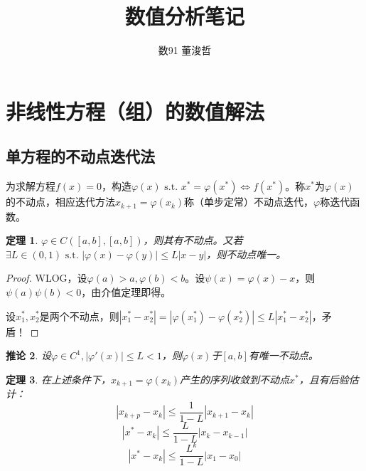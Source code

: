 \documentclass{ctexart}
\title{数值分析笔记}
\author{数91 董浚哲}
\begin{document}
\maketitle
\newcommand{\R}{\mathbf{R}}
\newcommand{\dd}{\,\mathrm{d}}
\newcommand{\st}{\text{ s.t. }}
\newcommand{\pp}[2]{\frac{\partial #1}{\partial #2}}
\newcommand{\fl}{\mathrm{fl}}
\newcommand{\nm}[1]{\left\|#1 \right\|}
\newcommand{\dif}[2]{\frac{\mathrm{d}#1}{\mathrm{d}#2}}

\newtheorem{Thm}{定理}[section]
\newtheorem{Lemma}[Thm]{引理}
\newtheorem{Prop}[Thm]{命题}
\newtheorem{Cor}[Thm]{推论}
\newtheorem{Def}{定义}[section]
\newtheorem{Rmk}{注}[section]
\newtheorem{Eg}{例}[section]
\newenvironment{solution}{\begin{proof}[Solution]}{\end{proof}}

\section{非线性方程（组）的数值解法}
\subsection{单方程的不动点迭代法}
为求解方程$f(x)=0$，构造$\varphi(x)\st x^*=\varphi(x^*)\Leftrightarrow f(x^*)$。称$x^*$为$\varphi(x)$的不动点，相应迭代方法$x_{k+1}=\varphi(x_k)$称（单步定常）不动点迭代，$\varphi$称迭代函数。

\begin{Thm}
$\varphi\in C([a,b],[a,b])$，则其有不动点。又若$\exists L\in (0,1)\st |\varphi(x)-\varphi(y)|\leq L|x-y|$，则不动点唯一。
\end{Thm}

\begin{proof}
WLOG，设$\varphi(a)>a,\varphi(b)<b$。设$\psi(x)=\varphi(x)-x$，则$\psi(a)\psi(b)<0$，由介值定理即得。

设$x_1^*,x_2^*$是两个不动点，则$|x_1^*-x_2^*|=|\varphi(x_1^*)-\varphi(x_2^*)|\leq L|x_1^*-x_2^*|$，矛盾！
\end{proof}

\begin{Cor}
设$\varphi\in C^1,|\varphi'(x)|\leq L<1$，则$\varphi(x)$于$[a,b]$有唯一不动点。
\end{Cor}

\begin{Thm}
在上述条件下，$x_{k+1}=\varphi(x_k)$产生的序列收敛到不动点$x^*$，且有后验估计：
\[|x_{k+p}-x_k|\leq\frac{1}{1-L}|x_{k+1}-x_k|\]
\[|x^*-x_k|\leq \frac{L}{1-L}|x_k-x_{k-1}|\]
\[|x^*-x_k|\leq \frac{L^k}{1-L}|x_1-x_0|\]
\end{Thm}
\end{document}
